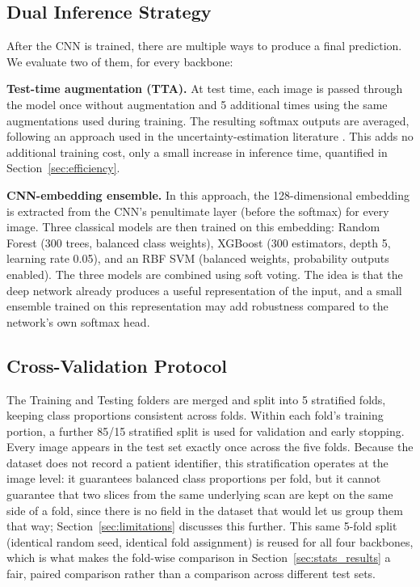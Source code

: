 \documentclass[11pt]{article}
\begin{document}
\subsection{Dual Inference Strategy}
\label{sec:inference}
After the CNN is trained, there are multiple ways to produce a final prediction. We evaluate two of them, for every backbone:

\textbf{Test-time augmentation (TTA).} At test time, each image is passed through the model once without augmentation and 5 additional times using the same augmentations used during training. The resulting softmax outputs are averaged, following an approach used in the uncertainty-estimation literature \cite{wang2019tta}. This adds no additional training cost, only a small increase in inference time, quantified in Section~\ref{sec:efficiency}.

\textbf{CNN-embedding ensemble.} In this approach, the 128-dimensional embedding is extracted from the CNN's penultimate layer (before the softmax) for every image. Three classical models are then trained on this embedding: Random Forest \cite{breiman2001randomforests} (300 trees, balanced class weights), XGBoost \cite{chen2016xgboost} (300 estimators, depth 5, learning rate 0.05), and an RBF SVM (balanced weights, probability outputs enabled). The three models are combined using soft voting. The idea is that the deep network already produces a useful representation of the input, and a small ensemble trained on this representation may add robustness compared to the network's own softmax head.

\subsection{Cross-Validation Protocol}
\label{sec:cv_protocol}
The Training and Testing folders are merged and split into 5 stratified folds, keeping class proportions consistent across folds. Within each fold's training portion, a further 85/15 stratified split is used for validation and early stopping. Every image appears in the test set exactly once across the five folds. Because the dataset does not record a patient identifier, this stratification operates at the image level: it guarantees balanced class proportions per fold, but it cannot guarantee that two slices from the same underlying scan are kept on the same side of a fold, since there is no field in the dataset that would let us group them that way; Section~\ref{sec:limitations} discusses this further. This same 5-fold split (identical random seed, identical fold assignment) is reused for all four backbones, which is what makes the fold-wise comparison in Section~\ref{sec:stats_results} a fair, paired comparison rather than a comparison across different test sets.
\end{document}
